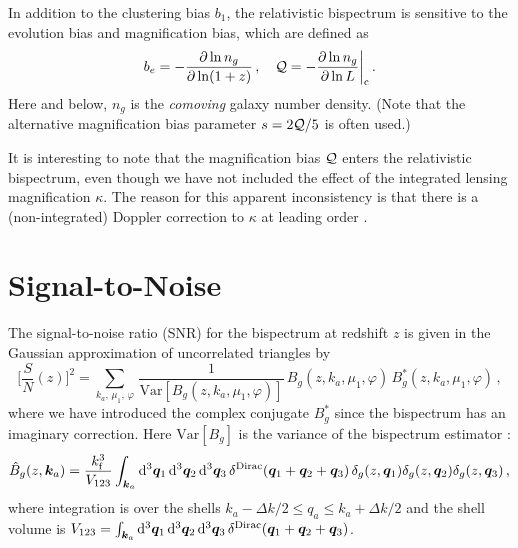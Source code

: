 In addition to the clustering bias  $b_1$, the relativistic bispectrum is sensitive to  the evolution bias and magnification bias, which  are defined as \cite{Alonso:2015uua}
\begin{equation} \label{bq}
b_e=  - \frac{\partial \ln n_g}{\partial\ln (1+z)}\,,~~~{ {\cal Q} =- \frac{\partial \ln n_g}{\partial\ln L}\bigg|_{\mathrm{c}}}\,.
\end{equation}
Here and below,  $n_{g}$ is the {\em comoving} galaxy number density.  (Note that the alternative magnification bias parameter  $s=2{\cal Q}/5$ is often used.)

{It is interesting to note that the magnification bias ${\cal Q}$ enters the relativistic bispectrum, even though we have not  included the effect of the integrated lensing magnification $\kappa$. The reason for this apparent inconsistency is that there is a (non-integrated) Doppler correction to $\kappa$ at leading order \cite{Bonvin:2008ni,Bolejko:2012uj}.} 
%
%
%
%
\section{Signal-to-Noise}
%
The signal-to-noise ratio (SNR) for the bispectrum  at redshift $z$ is given in the Gaussian approximation of uncorrelated triangles by \cite{Scoccimarro:2003wn}
\begin{equation}
\bigg[\frac{S}{N}(z)\bigg]^{2} = 
\sum_{k_a,\,\mu_{1},\,\varphi}\,\frac{1}{{\mathrm{Var}} [{B_{g}}(z, k_a,\mu_{1},\varphi)]}
\,B_{g}(z, k_{a},  \mu_{1},\varphi)\,B^*_{g}(z, k_a, \mu_{1},\varphi)\,,\label{eq:snrdef} %
\end{equation} 
where we have introduced the complex conjugate $B^*_{g}$ since the bispectrum  has an imaginary correction. {Here ${\mathrm{Var}} [{B_{g}}]$ is the variance  of the bispectrum estimator
 \cite{Chan:2016ehg}:
\begin{equation} \label{hatb}
\hat{B}_g(z,\bm{k}_a) = \frac{k_{\mathrm{f}}^3}{V_{123}}\int_{\bm{k}_a}\mathrm{d}^3\bm{q}_1\, \mathrm{d}^3\bm{q}_2 \,\mathrm{d}^3\bm{q}_3\,\delta^{{\mathrm{Dirac}}}(\bm{q}_1+\bm{q}_2+\bm{q}_3)\, \delta_g(z,\bm{q}_1) \delta_g(z,\bm{q}_2) \delta_g(z,\bm{q}_3) \,,
\end{equation}
where integration is over the shells $k_a-\Delta k/2\leq q_a \leq k_a+\Delta k/2$ and  the shell volume is
$V_{123}=\int_{\bm{k}_a}\mathrm{d}^3\bm{q}_1\, \mathrm{d}^3\bm{q}_2 \,\mathrm{d}^3\bm{q}_3\,\delta^{{\mathrm{Dirac}}}(\bm{q}_1+\bm{q}_2+\bm{q}_3)$.}


